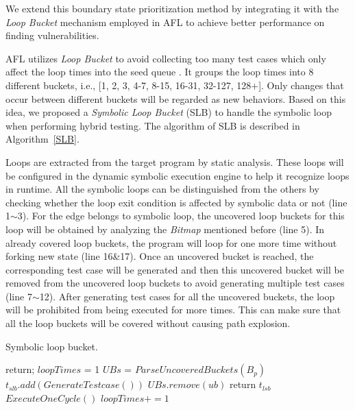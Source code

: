 We extend this boundary state prioritization method by integrating it 
with the \emph{Loop Bucket} mechanism employed in AFL \cite{online:afl} 
to achieve better performance on finding vulnerabilities.
 
AFL utilizes \emph{Loop Bucket} to avoid collecting too many test cases 
which only affect the loop times into the seed queue \cite{online:afl}. 
It groups the loop times into 8 different buckets, i.e., 
[1, 2, 3, 4-7, 8-15, 16-31, 32-127, 128+]. Only changes that occur 
between different buckets will be regarded as new behaviors. 
Based on this idea, we proposed a \textit{Symbolic Loop Bucket} (SLB) 
to handle the symbolic loop when performing hybrid testing. The 
algorithm of SLB is described in Algorithm~\ref{SLB}.

Loops are extracted from the target program by static analysis. 
These loops will be configured in the dynamic symbolic execution 
engine to help it recognize loops in runtime. All the symbolic loops 
can be distinguished from the others by checking whether the loop 
exit condition is affected by symbolic data or not (line 1$\sim$3). 
For the edge belongs to symbolic loop, the uncovered loop buckets 
for this loop will be obtained by analyzing the \textit{Bitmap} 
mentioned before (line 5). 
In already covered loop buckets, the program will loop for one more 
time without forking new state (line 16\&17). Once an uncovered bucket 
is reached, the corresponding test case will be generated and then 
this uncovered bucket will be removed from the uncovered loop buckets 
to avoid generating multiple test cases (line 7$\sim$12). After 
generating test cases for all the uncovered buckets, the loop will 
be prohibited from being executed for more times. This can make sure 
that all the loop buckets will be covered without causing path explosion.

\begin{algorithm}
  \LinesNumbered
  \caption{Symbolic loop bucket.}
  \label{SLB}
  {
    return;
  }
  $loopTimes$ = 1\;
  $UBs$ = $ParseUncoveredBuckets(B_p)$\;
  {
    {
      {
        $t_{slb}.add(GenerateTestcase())$\;
        $UBs$.$remove(ub)$\;
      }
    }
    {
      return $t_{lsb}$\;
    }{
      $ExecuteOneCycle()$\;
      $loopTimes += 1$\;
    }
  }
\end{algorithm}  

